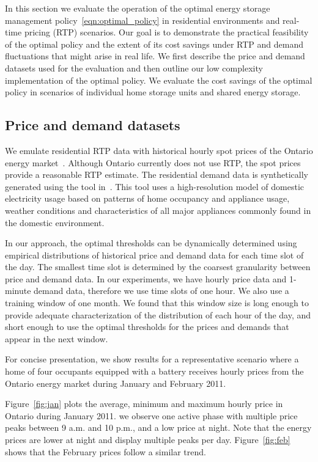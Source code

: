 \documentclass[journal]{IEEEtran}
\newcommand\1{\mathbf{1}}
\begin{document}
In this section we evaluate the operation of the optimal energy storage management policy~\eqref{eqn:optimal_policy} in residential environments and real-time pricing (RTP) scenarios.
Our goal is to demonstrate the practical feasibility of the optimal policy and the extent
of its cost savings under RTP and demand fluctuations that might arise in real life.
We first describe the price and demand datasets used for the evaluation and then outline
our low complexity implementation of the optimal policy.
We evaluate the cost savings of the optimal policy in scenarios of
individual home storage units and shared energy storage.

\subsection{Price and demand datasets}

We emulate residential RTP data with historical hourly
spot prices of the Ontario energy market~\cite{Ontario2010}. Although
Ontario currently does not use RTP, the spot prices provide
a reasonable RTP estimate.
The residential demand data is synthetically generated using
the tool in~\cite{RTIC10}. This tool uses a high-resolution model of
domestic electricity usage based on patterns of home
occupancy and appliance usage, weather conditions and characteristics of all major appliances commonly found in the
domestic environment.

In our approach, the optimal thresholds can be dynamically determined using empirical
distributions of historical price and demand data for each time slot of the day.
The smallest time slot is determined by the coarsest granularity between
price and demand data. In our experiments, we have hourly price data
and 1-minute demand data, therefore we use time slots of one hour.
We also use a training window of one month.
We found that this window size is long enough
to provide adequate characterization of the distribution of each hour of the day,
and short enough to use the optimal thresholds for the prices
and demands that appear in the next window.

For concise presentation, we show results for a representative scenario
where a home of four occupants equipped with a battery receives hourly prices
from the Ontario energy market during January and February 2011.

Figure~\ref{fig:jan} plots the average, minimum and maximum hourly price in Ontario during January 2011.
we observe one active phase with multiple price peaks between 9 a.m. and 10 p.m., and a low price at night.
Note that the energy prices are lower at night and display multiple peaks per day.
Figure~\ref{fig:feb} shows that the February prices follow a similar trend.
\end{document}
